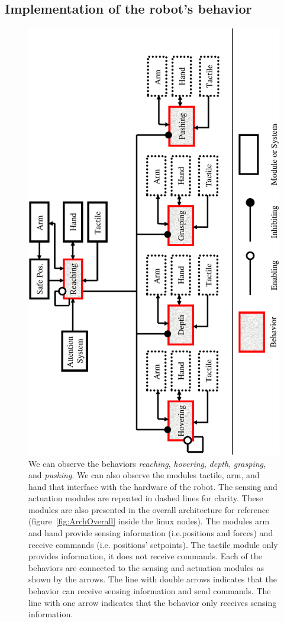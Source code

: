 \subsection{Implementation of the robot's behavior}
\label{sec:impbehavior}

%
\begin{figure}[htbp]
  \centerline{
    \includegraphics[height=\columnwidth, angle=270]{./figures/behaviorsD.eps}
  }\caption[Diagram of the behavior-based architecture]{We can observe the
  behaviors \emph{reaching}, \emph{hovering}, \emph{depth}, \emph{grasping}, and \emph{pushing}. We can also
  observe the modules tactile, arm, and hand that interface with the
  hardware of the robot. The sensing and actuation modules are repeated in dashed
  lines for clarity. These modules are also presented in the overall architecture
  for reference (figure~\ref{fig:ArchOverall} inside the linux nodes). The modules arm and hand provide sensing information
  (i.e.positions and forces) and receive commands (i.e. positions' setpoints).
  The tactile module only provides information, it does not receive commands.
  Each of the behaviors are connected to the sensing and actuation modules as shown
  by the arrows. The line with double arrows indicates that the behavior can
  receive sensing information and send commands. The line with one arrow
  indicates that the behavior only receives sensing information.
}
\end{figure}
